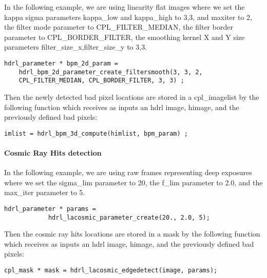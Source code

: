 In the following example, we are using linearity flat images
where we set the kappa sigma parameters
kappa\_low and kappa\_high to 3,3, and
maxiter to 2, 
the filter mode parameter to CPL\_FILTER\_MEDIAN,
the filter border parameter to 
CPL\_BORDER\_FILTER,
the smoothing kernel X and Y size parameters   
filter\_size\_x,filter\_size\_y to 3,3.


\begin{lstlisting}
hdrl_parameter * bpm_2d_param = 
    hdrl_bpm_2d_parameter_create_filtersmooth(3, 3, 2, 
    CPL_FILTER_MEDIAN, CPL_BORDER_FILTER, 3, 3) ;
\end{lstlisting}

Then the newly detected bad pixel locations are stored in a cpl\_imagelist
by the following function which receives as inputs an hdrl image,
himage, and the previously defined bad pixels:

\begin{lstlisting}
imlist = hdrl_bpm_3d_compute(himlist, bpm_param) ;
\end{lstlisting}

\paragraph{Cosmic Ray Hits detection}

In the following example, we are using raw frames representing deep exposures
where we set the sigma\_lim  parameter to 20,
the f\_lim parameter to 2.0,
and the max\_iter parameter to 5.

\begin{lstlisting}
hdrl_parameter * params =
            hdrl_lacosmic_parameter_create(20., 2.0, 5);
\end{lstlisting}

Then the cosmic ray hits locations are stored in a mask by the
following function which receives as inputs an hdrl image, himage, and 
the previously defined bad pixels:

\begin{lstlisting}
cpl_mask * mask = hdrl_lacosmic_edgedetect(image, params);
\end{lstlisting}

